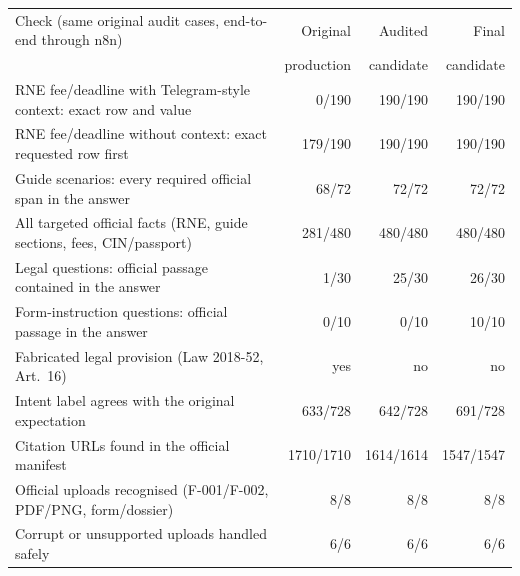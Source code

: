 \begin{tabular}{@{}lrrr@{}}
\toprule
Check (same original audit cases, end-to-end through n8n) & Original & Audited & Final \\
& production & candidate & candidate \\
\midrule
RNE fee/deadline with Telegram-style context: exact row and value & 0/190 & 190/190 & 190/190 \\
RNE fee/deadline without context: exact requested row first & 179/190 & 190/190 & 190/190 \\
Guide scenarios: every required official span in the answer & 68/72 & 72/72 & 72/72 \\
All targeted official facts (RNE, guide sections, fees, CIN/passport) & 281/480 & 480/480 & 480/480 \\
Legal questions: official passage contained in the answer & 1/30 & 25/30 & 26/30 \\
Form-instruction questions: official passage in the answer & 0/10 & 0/10 & 10/10 \\
Fabricated legal provision (Law 2018-52, Art.~16) & yes & no & no \\
Intent label agrees with the original expectation & 633/728 & 642/728 & 691/728 \\
Citation URLs found in the official manifest & 1710/1710 & 1614/1614 & 1547/1547 \\
Official uploads recognised (F-001/F-002, PDF/PNG, form/dossier) & 8/8 & 8/8 & 8/8 \\
Corrupt or unsupported uploads handled safely & 6/6 & 6/6 & 6/6 \\
\bottomrule
\end{tabular}
